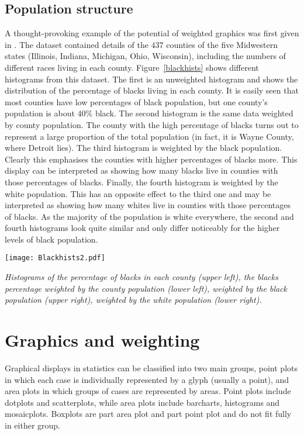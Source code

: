 \documentclass{svmult}
\begin{document}
\subsection{Population structure}
\label{pop}
A thought-provoking example of the potential of weighted graphics was first given in \cite{unwin:1998a}.  The dataset contained details of the $437$ counties of the five Midwestern states (Illinois, Indiana, Michigan, Ohio, Wisconsin), including the numbers of different races living in each county.  Figure~\ref{blackhists} shows different histograms from this dataset.  The first is an unweighted histogram and shows the distribution of the percentage of blacks living in each county.  It is easily seen that most counties have low percentages of black population, but one county's population is about $40\%$ black.  The second histogram is the same data weighted by county population.  The county with the high percentage of blacks turns out to represent a large proportion of the total population (in fact, it is Wayne County, where Detroit lies).  The third histogram is weighted by the black population.  Clearly this emphasises the counties with higher percentages of blacks more.  This display can be interpreted as showing how many blacks live in counties with those percentages of blacks.  Finally, the fourth histogram is weighted by the white population.  This has an opposite effect to the third one and may be interpreted as showing how many whites live in counties with those percentages of blacks.  As the majority of the population is white everywhere, the second and fourth histograms look quite similar and only differ noticeably for the higher levels of black population.

\begin{center}
      \texttt{[image: Blackhists2.pdf]}
      \caption{\label{blackhists}\em Histograms of the percentage of blacks in each county (upper left), the blacks percentage weighted by the county population (lower left), weighted by the black population (upper right), weighted by the white population (lower right).}
      \end{center}

\section{Graphics and weighting}
\label{gwts}
Graphical displays in statistics can be classified into two main groups, point plots in which each case is individually represented by a glyph (usually a point), and area plots in which groups of cases are represented by areas.  Point plots include dotplots and scatterplots, while area plots include barcharts, histograms and mosaicplots.  Boxplots are part area plot and part point plot and do not fit fully in either group.
\end{document}
